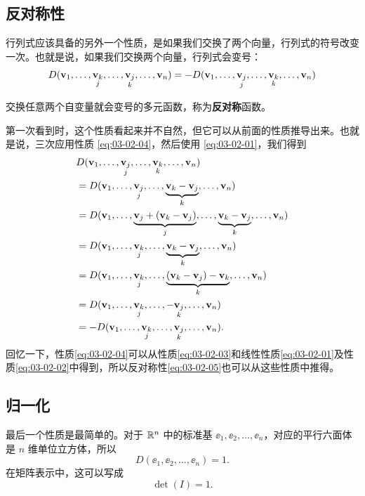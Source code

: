 \subsection{反对称性}\label{sec:03-02-04}

行列式应该具备的另外一个性质，是如果我们交换了两个向量，行列式的符号改变一次。也就是说，如果我们交换两个向量，行列式会变号：
\begin{equation}\label{eq:03-02-05}
D(\mathbf{v}_1, \dots, \underset{j}{\mathbf{v}_k}, \dots, \underset{k}{\mathbf{v}_j}, \dots, \mathbf{v}_n) = - D(\mathbf{v}_1, \dots, \underset{j}{\mathbf{v}_j}, \dots, \underset{k}{\mathbf{v}_k}, \dots, \mathbf{v}_n)
\end{equation}

\begin{remark*}
交换任意两个自变量就会变号的多元函数，称为\textbf{反对称}函数。
\end{remark*}
第一次看到时，这个性质看起来并不自然，但它可以从前面的性质推导出来。也就是说，三次应用性质 \eqref{eq:03-02-04}，然后使用 \eqref{eq:03-02-01}，我们得到
\begin{align*}
&D(\mathbf{v}_1, \dots, \underset{j}{\mathbf{v}_j}, \dots, \underset{k}{\mathbf{v}_k}, \dots, \mathbf{v}_n) \\
&= D(\mathbf{v}_1, \dots, \underset{j}{\mathbf{v}_j}, \dots, \underset{k}{\underbrace{\mathbf{v}_k - \mathbf{v}_j}}, \dots, \mathbf{v}_n) \\
&= D(\mathbf{v}_1, \dots, \underset{j}{\underbrace{\mathbf{v}_j + (\mathbf{v}_k - \mathbf{v}_j)}}, \dots, \underset{k}{\underbrace{\mathbf{v}_k - \mathbf{v}_j}}, \dots, \mathbf{v}_n) \\
&= D(\mathbf{v}_1, \dots, \underset{j}{\mathbf{v}_k}, \dots, \underset{k}{\underbrace{\mathbf{v}_k - \mathbf{v}_j}}, \dots, \mathbf{v}_n) \\
&= D(\mathbf{v}_1, \dots, \underset{j}{\mathbf{v}_k}, \dots, \underset{k}{\underbrace{(\mathbf{v}_k - \mathbf{v}_j) - \mathbf{v}_k}}, \dots, \mathbf{v}_n) \\
&= D(\mathbf{v}_1, \dots, \underset{j}{\mathbf{v}_k}, \dots, -\underset{k}{\mathbf{v}_j}, \dots, \mathbf{v}_n) \\
&= - D(\mathbf{v}_1, \dots, \underset{j}{\mathbf{v}_k}, \dots, \underset{k}{\mathbf{v}_j}, \dots, \mathbf{v}_n). \end{align*}
回忆一下，性质\eqref{eq:03-02-04}可以从性质\eqref{eq:03-02-03}和线性性质\eqref{eq:03-02-01}及性质\eqref{eq:03-02-02}中得到，所以反对称性\eqref{eq:03-02-05}也可以从这些性质中推得。

\subsection{归一化}\label{sec:03-02-05}

最后一个性质是最简单的。对于 $\mathbb{R}^n$ 中的标准基 $\ee_1, \ee_2, \dots, \ee_n$，对应的平行六面体是 $n$ 维单位立方体，所以
\begin{equation}\label{eq:03-02-06}
D(\ee_1, \ee_2, \dots, \ee_n) = 1.
\end{equation}
在矩阵表示中，这可以写成
$$\det (I) = 1.$$


